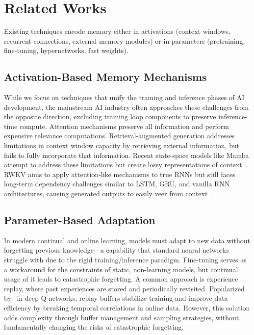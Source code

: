 \section{Related Works}

Existing techniques encode memory either in activations (context windows, recurrent connections, external memory modules) or in parameters (pretraining, fine-tuning, hypernetworks, fast weights).

\subsection{Activation-Based Memory Mechanisms}
While we focus on techniques that unify the training and inference phases of AI development, the mainstream AI industry often approaches these challenges from the opposite direction, excluding training loop components to preserve inference-time compute. Attention mechanisms preserve all information and perform expensive relevance computations. Retrieval-augmented generation addresses limitations in context window capacity by retrieving external information, but fails to fully incorporate that information. Recent state-space models like Mamba attempt to address these limitations but create lossy representations of context~\cite{gu_mamba_2024}. RWKV aims to apply attention-like mechanisms to true RNNs but still faces long-term dependency challenges similar to LSTM, GRU, and vanilla RNN architectures, causing generated outputs to easily veer from context~\cite{peng-etal-2023-rwkv}.

\subsection{Parameter-Based Adaptation}

In modern continual and online learning, models must adapt to new data without forgetting previous knowledge—a capability that standard neural networks struggle with due to the rigid training/inference paradigm. Fine-tuning serves as a workaround for the constraints of static, non-learning models, but continual usage of it leads to catastrophic forgetting. A common approach is experience replay, where past experiences are stored and periodically revisited. Popularized by~\cite{mnihHumanlevelControlDeep2015} in deep Q-networks, replay buffers stabilize training and improve data efficiency by breaking temporal correlations in online data. However, this solution adds complexity through buffer management and sampling strategies, without fundamentally changing the risks of catastrophic forgetting.

